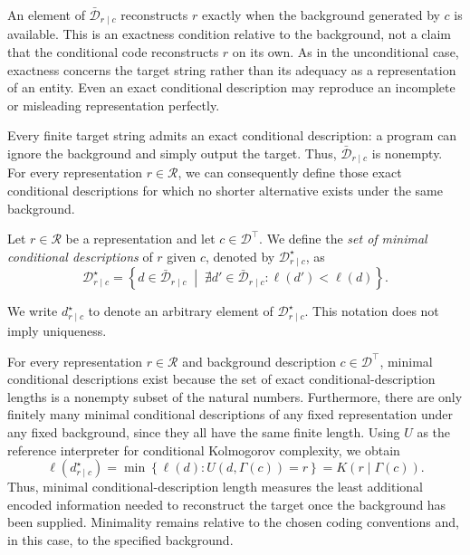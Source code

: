 An element of $\bar{\mathcal{D}}_{r\mid c}$ reconstructs $r$ exactly when the background generated by $c$ is available. This is an exactness condition relative to the background, not a claim that the conditional code reconstructs $r$ on its own. As in the unconditional case, exactness concerns the target string rather than its adequacy as a representation of an entity. Even an exact conditional description may reproduce an incomplete or misleading representation perfectly.

Every finite target string admits an exact conditional description: a program can ignore the background and simply output the target. Thus, $\bar{\mathcal{D}}_{r\mid c}$ is nonempty. For every representation $r\in\mathcal{R}$, we can consequently define those exact conditional descriptions for which no shorter alternative exists under the same background.

\begin{definition}
\label{def:minimal_conditional_description}
Let $r\in\mathcal{R}$ be a representation and let $c\in\mathcal{D}^\top$. We define the \emph{set of minimal conditional descriptions}  of $r$ given $c$, denoted by $\mathcal{D}_{r\mid c}^\star$, as
\[
\mathcal{D}_{r\mid c}^\star = \left\{d\in\bar{\mathcal{D}}_{r\mid c}\;\middle|\;
\nexists d'\in\bar{\mathcal{D}}_{r\mid c}: \ell(d')<\ell(d) \right\}.
\]
\end{definition}

We write $d_{r\mid c}^\star$ to denote an arbitrary element of $\mathcal{D}_{r\mid c}^\star$. This notation does not imply uniqueness.

For every representation $r\in\mathcal{R}$ and background description $c\in\mathcal{D}^\top$, minimal conditional descriptions exist because the set of exact conditional-description lengths is a nonempty subset of the natural numbers. Furthermore, there are only finitely many minimal conditional descriptions of any fixed representation under any fixed background, since they all have the same finite length. Using $U$ as the reference interpreter for conditional Kolmogorov complexity, we obtain
\[
\ell(d_{r\mid c}^\star) = \min \left\{\ell(d):U(d,\Gamma(c))=r \right\} = K(r\mid\Gamma(c)).
\]
Thus, minimal conditional-description length measures the least additional encoded information needed to reconstruct the target once the background has been supplied. Minimality remains relative to the chosen coding conventions and, in this case, to the specified background.

